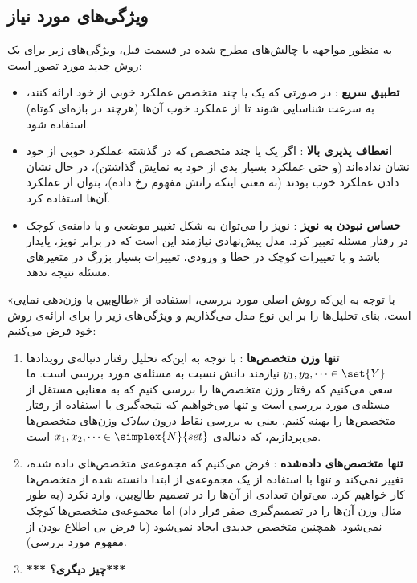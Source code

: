 \documentclass[a4paper,11px]{article}
\begin{document}
\subsection{
ویژگی‌های مورد نیاز
} 
به منظور مواجهه با چالش‌های مطرح شده در قسمت قبل، ویژگی‌های زیر برای یک روش جدید مورد تصور است:
\begin{itemize}
\item \textbf{
تطبیق سریع
}: 
در صورتی که یک یا چند متخصص عملکرد خوبی از خود ارائه کنند، به سرعت شناسایی شوند تا از عملکرد خوب آن‌ها (هرچند در بازه‌ای کوتاه) استفاده شود.
\item \textbf{
انعطاف پذیری بالا
}: 
اگر یک یا چند متخصص که در گذشته عملکرد خوبی از خود نشان نداده‌اند (و حتی عملکرد بسیار بدی از خود به نمایش گذاشتن)، در حال نشان دادن عملکرد خوب بودند (به معنی اینکه رانش مفهوم رخ داده)، بتوان از عملکرد آن‌ها استفاده کرد.

\item \textbf{
حساس نبودن به نویز
}: 
نویز را می‌توان به شکل تغییر موضعی و با دامنه‌ی کوچک در رفتار مسئله تعبیر کرد. مدل پیش‌نهادی نیازمند این است که در برابر نویز، پایدار باشد و با تغییرات کوچک در خطا و ورودی، تغییرات بسیار بزرگ در متغیرهای مسئله نتیجه ندهد.

\end{itemize}

با توجه به این‌که روش اصلی مورد بررسی، استفاده از «طالع‌بین با وزن‌دهی نمایی» است، بنای تحلیل‌ها را بر این نوع مدل می‌گذاریم و ویژگی‌های زیر را برای ارائه‌ی روش خود فرض می‌کنیم:
\begin{enumerate}
\item \textbf{
تنها وزن متخصص‌ها
}: 
با توجه به این‌که تحلیل رفتار دنباله‌ی رویدادها 
$y_1, y_2, \cdots \in \set{Y}$ 
نیازمند دانش نسبت به مسئله‌ی مورد بررسی است. ما سعی می‌کنیم که رفتار وزن متخصص‌ها را بررسی کنیم که به معنایی مستقل از مسئله‌ی مورد بررسی است و تنها می‌خواهیم که نتیجه‌گیری با استفاده از رفتار متخصص‌ها را بهینه کنیم. یعنی به بررسی نقاط درون 
\textit{
سادک
} 
وزن‌های متخصص‌ها می‌پردازیم، که دنباله‌ی 
$x_1, x_2, \cdots \in \simplex{N}{set} $ 
است.

\item \textbf{
تنها متخصص‌های داده‌شده
}: 
فرض می‌کنیم که مجموعه‌ی متخصص‌های داده شده، تغییر نمی‌کند و تنها با استفاده از یک مجموعه‌ی از ابتدا دانسته شده از متخصص‌ها کار خواهیم کرد. می‌توان تعدادی از آن‌ها را در تصمیم طالع‌بین، وارد نکرد (به طور مثال وزن آن‌ها را در تصمیم‌گیری صفر قرار داد) اما مجموعه‌ی متخصص‌ها کوچک نمی‌شود. همچنین متخصص جدیدی ایجاد نمی‌شود (با فرض بی اطلاع بودن از مفهوم مورد بررسی).

\item \textbf{
*** چیز دیگری؟***
}

\end{enumerate}
\end{document}

